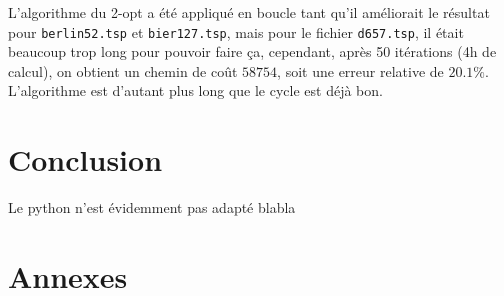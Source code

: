 \documentclass{scrartcl}
\begin{document}
    L'algorithme du 2-opt a été appliqué en boucle tant qu'il améliorait le
    résultat pour \verb+berlin52.tsp+ et \verb+bier127.tsp+, mais pour le
    fichier \verb+d657.tsp+, il était beaucoup trop long pour pouvoir faire ça,
    cependant, après 50 itérations (4h de calcul), on obtient un chemin de coût
    $58754$, soit une erreur relative de $20.1\%$. L'algorithme est d'autant
    plus long que le cycle est déjà bon.

\section{Conclusion}
   Le python n'est évidemment pas adapté blabla

\section{Annexes}
  \lstlistoflistings
  
  
  
  
  
  
  
\end{document}
